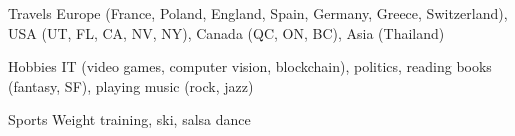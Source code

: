 


\begin{cvskills}


\cvskill
{Travels} %
{Europe (France, Poland, England, Spain, Germany, Greece, Switzerland), USA (UT, FL, CA, NV, NY), Canada (QC, ON, BC),  Asia (Thailand)}


\cvskill
{Hobbies} %
{IT (video games, computer vision, blockchain), politics, reading books (fantasy, SF), playing music (rock, jazz)}


\cvskill
{Sports} %
{Weight training, ski, salsa dance}


\end{cvskills}
